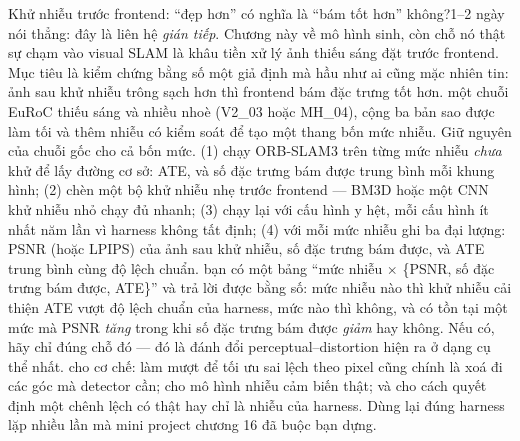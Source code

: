 \documentclass[../../deep_learning.tex]{subfiles}
\begin{document}
\begin{ungdung}
\end{ungdung}

\begin{duan}{Khử nhiễu trước frontend: ``đẹp hơn'' có nghĩa là ``bám tốt hơn'' không?}{1--2 ngày}
\dmt nói thẳng: đây là liên hệ \emph{gián tiếp}. Chương này về mô hình sinh, còn chỗ nó thật sự chạm vào visual SLAM là khâu tiền xử lý ảnh thiếu sáng đặt trước frontend. Mục tiêu là kiểm chứng bằng số một giả định mà hầu như ai cũng mặc nhiên tin: ảnh sau khử nhiễu trông sạch hơn thì frontend bám đặc trưng tốt hơn.
\ddl một chuỗi EuRoC thiếu sáng và nhiều nhoè (V2\_03 hoặc MH\_04), cộng ba bản sao được làm tối và thêm nhiễu có kiểm soát để tạo một thang bốn mức nhiễu. Giữ nguyên  của chuỗi gốc cho cả bốn mức.
\dbc (1) chạy ORB-SLAM3 trên từng mức nhiễu \emph{chưa} khử để lấy đường cơ sở: ATE, và số đặc trưng bám được trung bình mỗi khung hình; (2) chèn một bộ khử nhiễu nhẹ trước frontend --- BM3D hoặc một CNN khử nhiễu nhỏ chạy đủ nhanh; (3) chạy lại với cấu hình y hệt, mỗi cấu hình ít nhất năm lần vì harness không tất định; (4) với mỗi mức nhiễu ghi ba đại lượng: PSNR (hoặc LPIPS) của ảnh sau khử nhiễu, số đặc trưng bám được, và ATE trung bình cùng độ lệch chuẩn.
\dxk bạn có một bảng ``mức nhiễu \(\times\) \{PSNR, số đặc trưng bám được, ATE\}'' và trả lời được bằng số: mức nhiễu nào thì khử nhiễu cải thiện ATE vượt độ lệch chuẩn của harness, mức nào thì không, và có tồn tại một mức mà PSNR \emph{tăng} trong khi số đặc trưng bám được \emph{giảm} hay không. Nếu có, hãy chỉ đúng chỗ đó --- đó là đánh đổi perceptual--distortion hiện ra ở dạng cụ thể nhất.
\dnv {} cho cơ chế: làm mượt để tối ưu sai lệch theo pixel cũng chính là xoá đi các góc mà detector cần;  cho mô hình nhiễu cảm biến thật;  và  cho cách quyết định một chênh lệch có thật hay chỉ là nhiễu của harness. Dùng lại đúng harness lặp nhiều lần mà mini project chương 16 đã buộc bạn dựng.
\end{duan}
\end{document}
